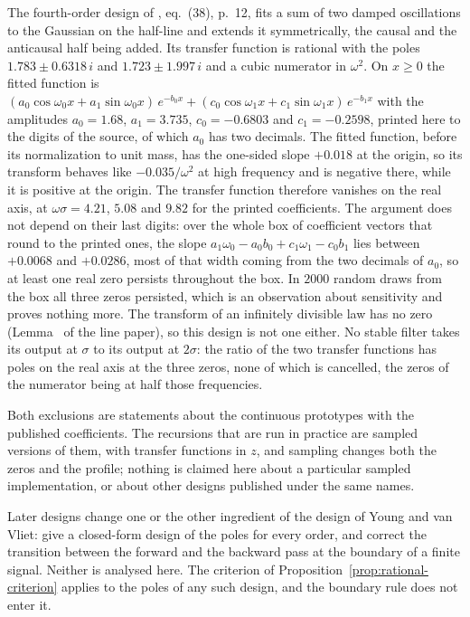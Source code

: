 \begin{example}
The fourth-order design of , eq.~(38), p.~12, fits a sum of two
damped oscillations to the Gaussian on the half-line and extends it symmetrically, the causal
and the anticausal half being added. Its transfer function is rational with the poles
$1.783 \pm 0.6318\,i$ and $1.723 \pm 1.997\,i$ and a cubic numerator in $\omega^2$. On
$x \ge 0$ the fitted function is
$(a_0\cos\omega_0x + a_1\sin\omega_0x)\,e^{-b_0x} + (c_0\cos\omega_1x + c_1\sin\omega_1x)\,e^{-b_1x}$
with the amplitudes $a_0 = 1.68$, $a_1 = 3.735$, $c_0 = -0.6803$ and $c_1 = -0.2598$, printed
here to the digits of the source, of which $a_0$ has two decimals. The fitted
function, before its normalization to unit mass, has the one-sided slope $+0.018$ at the
origin, so its transform behaves like $-0.035/\omega^2$ at high frequency and is negative
there, while it is positive at the origin. The transfer function therefore vanishes on the
real axis, at $\omega\sigma = 4.21$, $5.08$ and $9.82$ for the printed coefficients. The
argument does not depend on their last digits: over the whole box of coefficient vectors
that round to the printed ones, the slope $a_1\omega_0 - a_0b_0 + c_1\omega_1 - c_0b_1$ lies
between $+0.0068$ and $+0.0286$, most of that width coming from the two decimals of $a_0$, so at least
one real zero persists throughout the box. In $2000$ random draws from the box all three
zeros persisted, which is an observation about sensitivity and proves nothing more. The
transform of an infinitely divisible law has no zero (Lemma~ of the
line paper), so this design is not one either. No stable filter takes its output at $\sigma$
to its output at $2\sigma$: the ratio of the two transfer functions has poles on the real
axis at the three zeros, none of which is cancelled, the zeros of the numerator being at half
those frequencies.

Both exclusions are statements about the continuous prototypes with the published
coefficients. The recursions that are run in practice are sampled versions of them, with
transfer functions in $z$, and sampling changes both the zeros and the profile; nothing is
claimed here about a particular sampled implementation, or about other designs published
under the same names.

Later designs change one or the other ingredient of the design of Young and van Vliet:
 give a closed-form design of the poles for every order, and
 correct the transition between the forward and the backward pass
at the boundary of a finite signal. Neither is analysed here. The criterion of
Proposition~\ref{prop:rational-criterion} applies to the poles of any such design, and the
boundary rule does not enter it.


\end{example}
